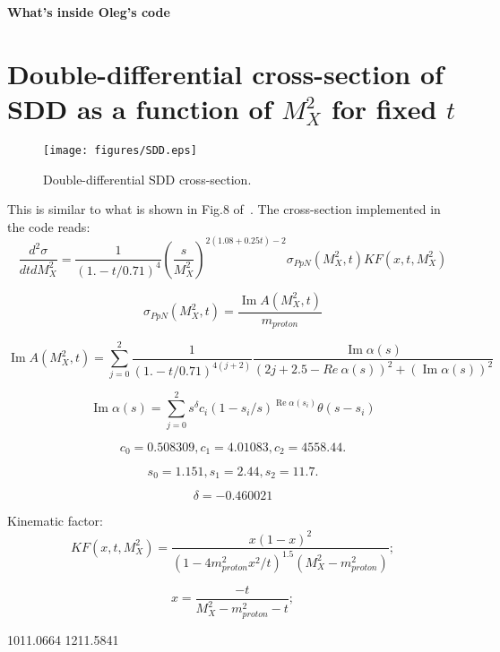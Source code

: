 \documentclass[12pt]{article}
\renewcommand{\Re}{\operatorname{Re}}
\renewcommand{\Im}{\operatorname{Im}}
\begin{document}
\vskip 0.5cm \centerline{\bf\Large What's inside Oleg's code}
\vskip 1cm

\section{Double-differential cross-section of SDD as a function of $M_X^2$ for fixed $t$}
\begin{figure}[!h]
\centering
\texttt{[image: figures/SDD.eps]}
\caption{Double-differential SDD cross-section.}
\label{fig:diagrams}
\end{figure}
This is similar to what is shown in Fig.8 of~\cite{Jenkovszky11}.
The cross-section implemented in the code reads:
$$
\frac{d^2\sigma}{dt dM_X^2}=\frac{1}{(1. - t/0.71)^4} \left(\frac{s}{M_X^2}\right)^{2(1.08 + 0.25t) - 2} \sigma_{PpN}(M_X^2,t) KF(x,t,M_X^2)
$$

$$
\sigma_{PpN}(M_X^2,t)=\frac{\Im A(M_X^2,t)}{m_{proton}}
$$

$$
\Im A(M_X^2,t) = \sum_{j=0}^{2}\frac{1}{(1. - t/0.71)^{4(j+2)}} \frac{\Im\alpha(s)}{(2 j+2.5-Re\ \alpha(s))^2+(\Im\alpha(s))^2}
$$

$$
\Im\alpha(s) = \sum_{j=0}^{2} s^\delta c_i (1-s_i/s)^{\Re\alpha(s_i)} \theta(s-s_i) 
$$

$$
c_0=  0.508309,
c_1 = 4.01083,
c_2 = 4558.44.
$$
  
$$
s_0=  1.151,
s_1 = 2.44,
s_2 = 11.7.
$$

$$
\delta=-0.460021
$$

Kinematic factor:
$$
KF(x,t,M_X^2) = \frac{x (1-x)^2}{\left(1 - 4m_{proton}^2x^2/t\right)^{1.5}(M_X^2-m_{proton}^2)};
$$

$$
x = \frac{-t}{M_X^2 - m_{proton}^2 - t};
$$




\begin{thebibliography}{99}
 1011.0664
 1211.5841
\end{thebibliography}
\end{document}
